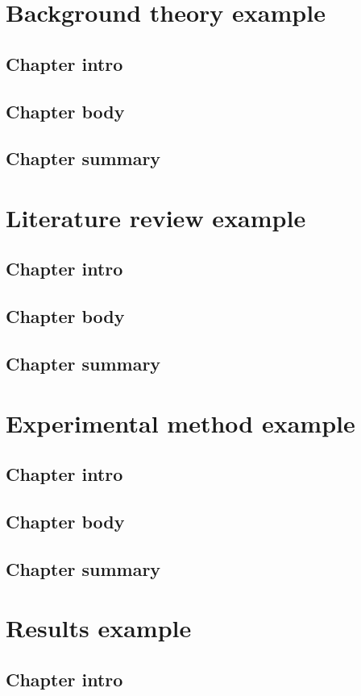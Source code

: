 \chapter{Background theory example}
   \section{Chapter intro}
   \section{Chapter body}
   \section{Chapter summary}

\chapter{Literature review example}
   \section{Chapter intro}
   \section{Chapter body}
   \section{Chapter summary}

\chapter{Experimental method example}
   \section{Chapter intro}
   \section{Chapter body}
   \section{Chapter summary}

\chapter{Results example}
   \section{Chapter intro}

